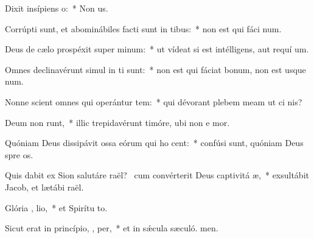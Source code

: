 \item Dixit insípiens   o:~* Non  us.
\item Corrúpti sunt, et abominábiles facti sunt in tibus:~* non est qui fáci num.
\item Deus de cælo prospéxit super  minum:~* ut vídeat si est intélligens, aut requí um.
\item Omnes declinavérunt simul in ti sunt:~* non est qui fáciat bonum, non est usque  num.
\item Nonne scient omnes qui operántur tem:~* qui dévorant plebem meam ut ci nis?
\item Deum non runt,~* illic trepidavérunt timóre, ubi non e mor.
\item Quóniam Deus dissipávit ossa eórum qui ho cent:~* confúsi sunt, quóniam Deus spre os.
\item Quis dabit ex Sion salutáre raël?~\pscross{} cum convérterit Deus captivitá  æ,~* exsultábit Jacob, et lætábi raël.
\item Glória ,  lio,~* et Spirítu to.
\item Sicut erat in princípio,  ,  per,~* et in sǽcula sæculó. men.
